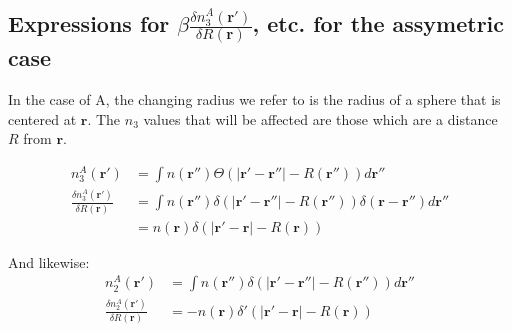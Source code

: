 \documentclass[letterpaper,twocolumn,amsmath,amssymb,jcp,10pt,aip]{revtex4-1}
\begin{document}
\begin{widetext}
\subsection{Expressions for $\beta\frac{\delta n_3^{A}(\mathbf{r}')}{\delta R(\mathbf{r})}$, etc. for the assymetric case}\label{appendix:g-A}

In the case of A, the changing radius we refer to is the radius of a sphere that is centered at $\mathbf{r}$.  The $n_3$ values that will be affected are those which are a distance $R$ from $\mathbf{r}$.

\begin{align}
  n_3^{A}(\mathbf{r}') &= \int n(\mathbf{r}'') \Theta(\left|\mathbf{r}' - \mathbf{r}''\right| -R(\mathbf{r}'')) d\mathbf{r}''\\ 
  \frac{\delta n_3^{A} (\mathbf{r}')}{\delta R(\mathbf{r})} &=
  \int n (\mathbf{r}'') \delta(|\mathbf{r}' - \mathbf{r}''| - R(\mathbf{r}'')) \delta(\mathbf{r}-\mathbf{r}'') d\mathbf{r}'' \\
   &= n (\mathbf{r}) \delta(|\mathbf{r'} - \mathbf{r}| - R(\mathbf{r}))
\end{align}
 
And likewise:
\begin{align}
  n_2^{A}(\mathbf{r}') &= \int n(\mathbf{r}'') \delta(|\mathbf{r}' - \mathbf{r}''| - R(\mathbf{r}'')) d \mathbf{r}''\\
  \frac{\delta n_2^{A}(\mathbf{r}')}{\delta R(\mathbf{r})} &= -n(\mathbf{r}) \delta'(|\mathbf{r}' - \mathbf{r}| - R(\mathbf{r}))\\
 \end{align}


\end{widetext}
\end{document}
